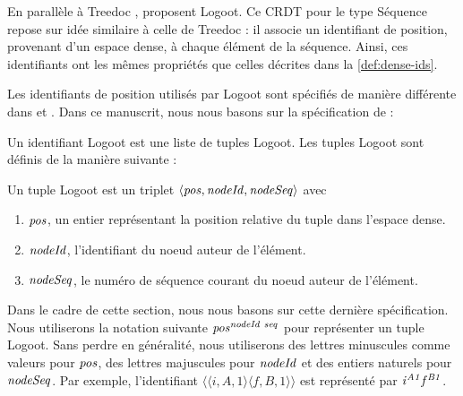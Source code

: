En parallèle à Treedoc \cite{2009-treedoc-preguica}, \textcite{2009-logoot-weiss} proposent Logoot.
Ce \ac{CRDT} pour le type Séquence repose sur idée similaire à celle de Treedoc : il associe un identifiant de position, provenant d'un espace dense, à chaque élément de la séquence.
Ainsi, ces identifiants ont les mêmes propriétés que celles décrites dans la \autoref{def:dense-ids}.

Les identifiants de position utilisés par Logoot sont spécifiés de manière différente dans \cite{2009-logoot-weiss} et \cite{2010-logoot-undo-weiss}.
Dans ce manuscrit, nous nous basons sur la spécification de \cite{2010-logoot-undo-weiss} :
\begin{definition}
  Un identifiant Logoot est une liste de tuples Logoot.
  Les tuples Logoot sont définis de la manière suivante :
  \begin{subdefinition}
    Un tuple Logoot est un triplet $\langle \mathit{pos},\mathit{nodeId},\mathit{nodeSeq} \rangle$ avec
    \begin{enumerate}
      \item $\mathit{pos}$, un entier représentant la position relative du tuple dans l'espace dense.
      \item $\mathit{nodeId}$, l'identifiant du noeud auteur de l'élément.
      \item $\mathit{nodeSeq}$, le numéro de séquence courant du noeud auteur de l'élément.
    \end{enumerate}
  \end{subdefinition}
\end{definition}

Dans le cadre de cette section, nous nous basons sur cette dernière spécification.
Nous utiliserons la notation suivante $\mathit{pos}^{\mathit{nodeId~seq}}_{\mathit{}}$ pour représenter un tuple Logoot.
Sans perdre en généralité, nous utiliserons des lettres minuscules comme valeurs pour $\mathit{pos}$, des lettres majuscules pour $\mathit{nodeId}$ et des entiers naturels pour $\mathit{nodeSeq}$.
Par exemple, l'identifiant $\langle \langle i,A,1 \rangle \langle f,B,1 \rangle \rangle$ est représenté par $\mathit{i}^{\mathit{A1}}_{\mathit{}}\mathit{f}^{\mathit{B1}}_{\mathit{}}$.

